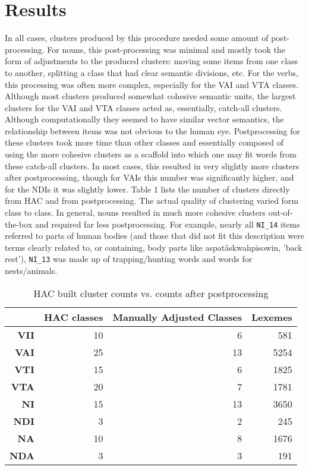 \section{Results}
In all cases, clusters produced by this procedure needed some amount of post-processing. For nouns, this post-processing was minimal and mostly took the form of adjustments to the produced clusters: moving some items from one class to another, splitting a class that had clear semantic divisions, etc. For the verbs, this processing was often more complex, especially for the VAI and VTA classes. Although most clusters produced somewhat cohesive semantic units, the largest clusters for the VAI and VTA classes acted as, essentially, catch-all clusters. Although computationally they seemed to have similar vector semantics, the relationship between items was not obvious to the human eye. Postprocessing for these clusters took more time than other classes and essentially composed of using the more cohesive clusters as a scaffold into which one may fit words from these catch-all clusters. In most cases, this resulted in very slightly more clusters after postprocessing, though for VAIs this number was significantly higher, and for the NDIs it was slightly lower. Table 1 lists the number of clusters directly from HAC and from postprocessing. The actual quality of clustering varied form class to class. In general, nouns resulted in much more cohesive clusters out-of-the-box and required far less postprocessing. For example, nearly all \texttt{NI_14} items referred to parts of human bodies (and those that did not fit this description were terms clearly related to, or containing, body parts like aspatâskwahpisowin, 'back rest'), \texttt{NI_13} was made up of trapping/hunting words and words for nests/animals.
\begin{table*}[]
\centering
 \begin{tabular}{rrrr}
\toprule
    &\textbf{HAC classes} & \textbf{Manually Adjusted Classes} & \textbf{Lexemes}\\
\midrule
\textbf{VII} & 10          & 6     & 581                 \\
\textbf{VAI} & 25          & 13     & 5254                \\
\textbf{VTI} & 15          & 6     & 1825                \\
\textbf{VTA} & 20          & 7     & 1781                \\
\textbf{NI}  & 15          & 13     & 3650                \\
\textbf{NDI} & 3           & 2      & 245                 \\
\textbf{NA}  & 10          & 8     & 1676                \\
\textbf{NDA} & 3           & 3      & 191                 \\
\bottomrule
\end{tabular}
\centering
\caption{HAC built cluster counts vs. counts after postprocessing}
\label{tabhac}
\end{table*}

